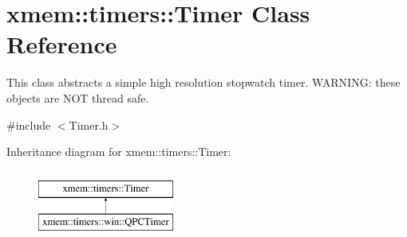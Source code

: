 \hypertarget{classxmem_1_1timers_1_1_timer}{}\section{xmem\+:\+:timers\+:\+:Timer Class Reference}
\label{classxmem_1_1timers_1_1_timer}


This class abstracts a simple high resolution stopwatch timer. W\+A\+R\+N\+I\+N\+G\+: these objects are N\+O\+T thread safe.  




{\ttfamily \#include $<$Timer.\+h$>$}

Inheritance diagram for xmem\+:\+:timers\+:\+:Timer\+:\begin{figure}[H]
\begin{center}
\leavevmode
\includegraphics[height=2.000000cm]{classxmem_1_1timers_1_1_timer}
\end{center}
\end{figure}

